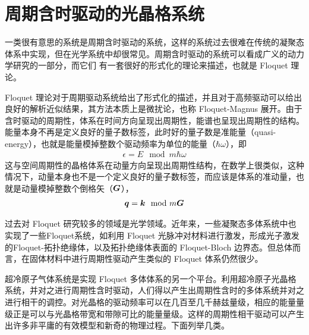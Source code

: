\section{周期含时驱动的光晶格系统}

一类很有意思的系统是周期含时驱动的系统，这样的系统过去很难在传统的凝聚态体系中实现，但在光学系统中却很常见。周期含时驱动的系统可以看成广义的动力学研究的一部分，而它们
有一套很好的形式化的理论来描述，也就是 Floquet 理论\cite{floquet2017}。

Floquet 理论对于周期驱动系统给出了形式化的描述，并且对于高频驱动可以给出良好的解析近似结果\cite{highfreq2015}，其方法本质上是微扰论，也称 Floquet-Magnus 展开\cite{floquet-magnus-2001}。由于含时驱动的周期性，体系在时间方向呈现出周期性，能谱也呈现出周期性的结构。能量本身不再是定义良好的量子数标签，此时好的量子数是准能量（quasi-energy），也就是能量模掉整数个驱动频率为单位的能量（$\hbar\omega$），即
\begin{align}
\epsilon = E \mod m\hbar\omega
\end{align}
这与空间周期性的晶格体系在动量方向呈现出周期性结构，在数学上很类似，这种情况下，动量本身也不是一个定义良好的量子数标签，而应该是体系的准动量，也就是动量模掉整数个倒格矢（$\boldsymbol{G}$），
\begin{align}
\boldsymbol{q} = \boldsymbol{k} \mod m \boldsymbol{G}
\end{align}

过去对 Floquet 研究较多的领域是光学领域\cite{shirley1965,sambe1973}。近年来，一些凝聚态多体系统中也实现了一些Floquet系统，如利用 Floquet 光脉冲对材料进行激发，形成光子激发的Floquet-拓扑绝缘体\cite{photon-floq-2013}，以及拓扑绝缘体表面的 Floquet-Bloch 边界态\cite{floq-bloch-2013}。但总体而言，在固体材料中进行周期性驱动产生类似的 Floquet 体系仍然很少。

超冷原子气体系统是实现 Floquet 多体体系的另一个平台。利用超冷原子光晶格系统，并对之进行周期性含时驱动，人们得以产生出周期性含时的多体系统并对之进行相干的调控\cite{floquet2017}。对光晶格的驱动频率可以在几百至几千赫兹量级，相应的能量量级正是可以与光晶格带宽和带隙可比的能量量级。这样的周期性相干驱动可以产生出许多非平庸的有效模型和新奇的物理过程。下面列举几类。

